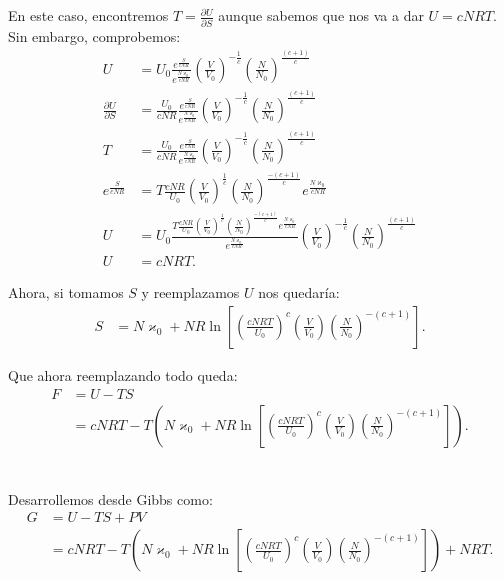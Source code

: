 \documentclass{report}
\begin{document}
\section{}

En este caso, encontremos $T = \frac{\partial U}{\partial S}$ aunque sabemos que nos va a dar $U = cNRT$. Sin embargo, comprobemos:
\begin{align*}
U &= U_0\frac{e^{\frac{S}{cNR}}}{e^{\frac{N\varkappa_0}{cNR}}} \left( \frac{V}{V_0} \right)^{-\frac{1}{c}}\left( \frac{N}{N_0} \right)^{\frac{\left( c + 1 \right)}{c}}\\
\frac{\partial U}{\partial S} &= \frac{U_0}{cNR} \frac{e^{\frac{S}{cNR}}}{e^{\frac{N\varkappa_0}{cNR}}} \left( \frac{V}{V_0} \right)^{-\frac{1}{c}}\left( \frac{N}{N_0} \right)^{\frac{\left( c + 1 \right)}{c}}\\
T &= \frac{U_0}{cNR} \frac{e^{\frac{S}{cNR}}}{e^{\frac{N\varkappa_0}{cNR}}} \left( \frac{V}{V_0} \right)^{-\frac{1}{c}}\left( \frac{N}{N_0} \right)^{\frac{\left( c + 1 \right)}{c}}\\
e^{\frac{S}{cNR}} &= T \frac{cNR}{U_0}\left( \frac{V}{V_0} \right)^{\frac{1}{c}}\left( \frac{N}{N_0} \right)^{\frac{-\left( c + 1 \right)}{c}} e^{\frac{N\varkappa_0}{cNR}} \\
U &= U_0\frac{T \frac{cNR}{U_0}\left( \frac{V}{V_0} \right)^{\frac{1}{c}}\left( \frac{N}{N_0} \right)^{\frac{-\left( c + 1 \right)}{c}} e^{\frac{N\varkappa_0}{cNR}}}{e^{\frac{N\varkappa_0}{cNR}}} \left( \frac{V}{V_0} \right)^{-\frac{1}{c}}\left( \frac{N}{N_0} \right)^{\frac{\left( c + 1 \right)}{c}}\\
U &= cNRT
.\end{align*}

Ahora, si tomamos $S$ y reemplazamos $U$ nos quedaría:
\begin{align*}
  S &= N\varkappa_0 + NR\ln\left[ \left( \frac{cNRT}{U_0} \right)^{c} \left( \frac{V}{V_0} \right) \left( \frac{N}{N_0} \right)^{-\left( c + 1 \right) } \right]
.\end{align*}

Que ahora reemplazando todo queda:
\begin{align*}
  F &= U - TS \\
  &= cNRT - T\left( N\varkappa_0 + NR\ln\left[ \left( \frac{cNRT}{U_0} \right)^{c} \left( \frac{V}{V_0} \right) \left( \frac{N}{N_0} \right)^{-\left( c + 1 \right) } \right] \right)
.\end{align*}

\section{}

Desarrollemos desde Gibbs como:
\begin{align*}
  G &= U - TS + PV \\
  &= cNRT - T\left( N\varkappa_0 + NR\ln\left[ \left( \frac{cNRT}{U_0} \right)^{c} \left( \frac{V}{V_0} \right) \left( \frac{N}{N_0} \right)^{-\left( c + 1 \right) } \right] \right) + NRT
.\end{align*}
\end{document}
